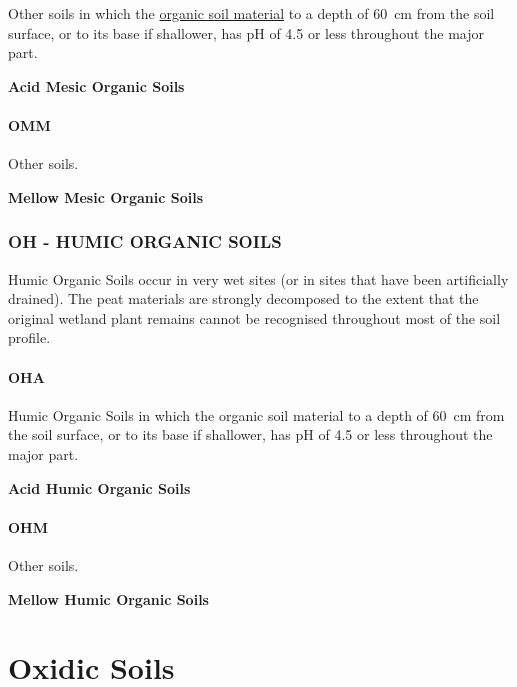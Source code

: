 \documentclass[
  letterpaper,
  DIV=11,
  numbers=noendperiod]{scrreprt}
\begin{document}
Other soils in which the \protect\hyperlink{sec-diag-org}{organic soil
material} to a depth of 60~cm from the soil surface, or to its base if
shallower, has pH of 4.5 or less throughout the major part.

\textbf{Acid Mesic Organic Soils}

\hypertarget{sec-key-OMM}{%
\subsubsection{\texorpdfstring{\textbf{OMM}}{OMM}}\label{sec-key-OMM}}

Other soils.

\textbf{Mellow Mesic Organic Soils}

\hypertarget{sec-OH}{%
\subsection{\texorpdfstring{\textbf{OH} - HUMIC ORGANIC
SOILS}{OH - HUMIC ORGANIC SOILS}}\label{sec-OH}}

Humic Organic Soils occur in very wet sites (or in sites that have been
artificially drained). The peat materials are strongly decomposed to the
extent that the original wetland plant remains cannot be recognised
throughout most of the soil profile.

\hypertarget{sec-key-OHA}{%
\subsubsection{\texorpdfstring{\textbf{OHA}}{OHA}}\label{sec-key-OHA}}

Humic Organic Soils in which the organic soil material to a depth of
60~cm from the soil surface, or to its base if shallower, has pH of 4.5
or less throughout the major part.

\textbf{Acid Humic Organic Soils}

\hypertarget{sec-key-OHM}{%
\subsubsection{\texorpdfstring{\textbf{OHM}}{OHM}}\label{sec-key-OHM}}

Other soils.

\textbf{Mellow Humic Organic Soils}


\hypertarget{sec-ord-X}{%
\chapter{Oxidic Soils}\label{sec-ord-X}}
\end{document}
